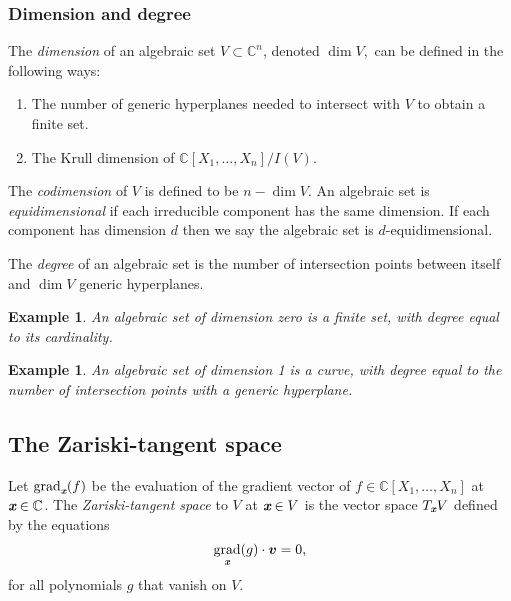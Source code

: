 \documentclass[a4paper]{article}
\def\xb{\textit{\textbf{x}}}
\DeclareMathOperator{\grad}{grad}
\def\C{\mathbb{C}}
\newtheorem{ex}[theorem]{Example}
\begin{document}
\subsubsection{Dimension and degree}
The \textit{dimension} of an algebraic set $V \subset \C^n$, denoted $\dim V,$ can be defined in the following ways:
\begin{enumerate}
    \item The number of generic hyperplanes needed to intersect with $V$ to obtain a finite set. 
    \item The Krull dimension of $\C[X_1,\hdots,X_n]/I(V)$.
\end{enumerate}
The \textit{codimension} of $V$ is defined to be $n - \dim V$. An algebraic set is \textit{equidimensional} if each irreducible component has the same dimension.  If each component has dimension $d$ then we say the algebraic set is $d$-equidimensional.
\par
The \textit{degree} of an algebraic set is the number of intersection points between itself and $\dim V$ generic hyperplanes.
%
\begin{ex}
An algebraic set of dimension zero is a finite set, with degree equal to its cardinality.
\end{ex}
%
\begin{ex}
An algebraic set of dimension 1 is a curve, with degree equal to the number of intersection points with a generic hyperplane.
\end{ex}
%



\subsection{The Zariski-tangent space}
Let $\grad_{\xb}(f)$ be the evaluation of the gradient vector of $f \in \C[X_1,\hdots,X_n]$ at $\xb \in \C$. The \textit{Zariski-tangent space} to $V$ at $\xb \in V$ is the vector space $T_{\xb}V$ defined by the equations 
\[
\grad_{\xb} (g) \cdot \bm v = 0,
\] 
for all polynomials $g$ that vanish on $V$. 
%
\end{document}
